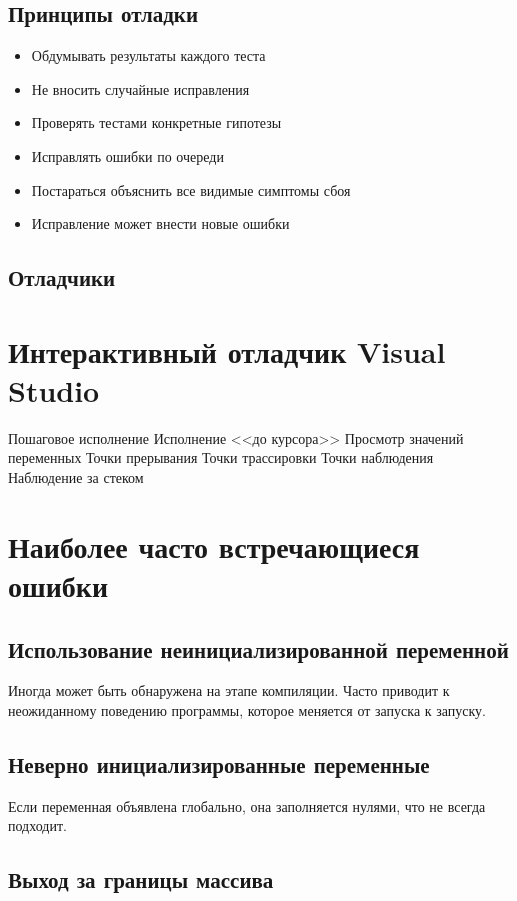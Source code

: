 \documentclass[14pt,openany]{book}
\begin{document}
\section{Принципы отладки}

\begin{itemize}
\item Обдумывать результаты каждого теста
\item Не вносить случайные исправления
\item Проверять тестами конкретные гипотезы
\item Исправлять ошибки по очереди
\item Постараться объяснить все видимые симптомы сбоя
\item Исправление может внести новые ошибки
\end{itemize}

\section{Отладчики}

\chapter{Интерактивный отладчик Visual Studio}

Пошаговое исполнение
Исполнение <<до курсора>>
Просмотр значений переменных
Точки прерывания
Точки трассировки
Точки наблюдения
Наблюдение за стеком

\chapter{Наиболее часто встречающиеся ошибки}

\section{Использование неинициализированной переменной}

Иногда может быть обнаружена на этапе компиляции.
Часто приводит к неожиданному поведению программы, которое меняется от запуска
к запуску. 

\section{Неверно инициализированные переменные}

Если переменная объявлена глобально, она заполняется нулями, что не всегда подходит.

\section{Выход за границы массива}
\end{document}

